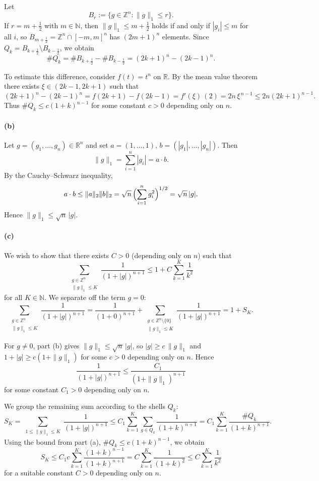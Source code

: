 \documentclass[12pt,a4paper]{article}
\theoremstyle{plain}
\theoremstyle{definition}
\theoremstyle{remark}
\theoremstyle{remark}
\begin{document}
Let
\[
B_r := \{g\in\mathbb{Z}^n : \|g\|_1 \le r\}.
\]
If $r=m+\tfrac12$ with $m\in\mathbb{N}$, then
$\|g\|_1\le m+\tfrac12$ holds if and only if $|g_i|\le m$ for all $i$,
so $B_{m+\frac12}=\mathbb{Z}^n\cap[-m,m]^n$ has $(2m+1)^n$ elements.
Since $Q_k = B_{k+\frac12}\setminus B_{k-\frac12}$, we obtain
\[
\#Q_k = \#B_{k+\frac12} - \#B_{k-\frac12}
= (2k+1)^n - (2k-1)^n.
\]

To estimate this difference, consider $f(t)=t^n$ on $\mathbb{R}$.  By the
mean value theorem there exists $\xi\in(2k-1,2k+1)$ such that
\[
(2k+1)^n - (2k-1)^n
= f(2k+1)-f(2k-1)
= f'(\xi)\,(2)
= 2n\,\xi^{\,n-1}
\le 2n(2k+1)^{n-1}.
\]
Thus $\#Q_k\le c(1+k)^{n-1}$ for some constant $c>0$ depending only on
$n$.

\paragraph{(b)}
Let $g=(g_1,\dots,g_n)\in\mathbb{R}^n$ and set
$a=(1,\dots,1)$, $b=(|g_1|,\dots,|g_n|)$.  Then
\[
\|g\|_1 = \sum_{i=1}^n |g_i| = a\cdot b.
\]
By the Cauchy--Schwarz inequality,
\[
a\cdot b \le \|a\|_2 \|b\|_2
= \sqrt{n}\,\Bigl(\sum_{i=1}^n g_i^2\Bigr)^{1/2}
= \sqrt{n}\,|g|.
\]
Hence $\|g\|_1 \le \sqrt{n}\,|g|$.

\paragraph{(c)}
We wish to show that there exists $C>0$ (depending only on $n$) such
that
\[
\sum_{\substack{g\in\mathbb{Z}^n\\ \|g\|_1\le K}}
\frac{1}{(1+|g|)^{n+1}}
\le 1 + C\sum_{k=1}^K \frac{1}{k^2}
\]
for all $K\in\mathbb{N}$.  We separate off the term $g=0$:
\[
\sum_{\substack{g\in\mathbb{Z}^n\\ \|g\|_1\le K}}
\frac{1}{(1+|g|)^{n+1}}
= \frac{1}{(1+0)^{n+1}}
+ \sum_{\substack{g\in\mathbb{Z}^n\setminus\{0\}\\ \|g\|_1\le K}}
\frac{1}{(1+|g|)^{n+1}}
= 1 + S_K.
\]

For $g\neq 0$, part (b) gives $\|g\|_1 \le \sqrt{n}\,|g|$, so
$|g| \ge c\,\|g\|_1$ and $1+|g| \ge c(1+\|g\|_1)$ for some $c>0$
depending only on $n$.  Hence
\[
\frac{1}{(1+|g|)^{n+1}}
\le \frac{C_1}{(1+\|g\|_1)^{n+1}}
\]
for some constant $C_1>0$ depending only on $n$.

We group the remaining sum according to the shells $Q_k$:
\[
S_K
= \sum_{\substack{1\le\|g\|_1\le K}}
\frac{1}{(1+|g|)^{n+1}}
\le C_1 \sum_{k=1}^K \sum_{g\in Q_k}
\frac{1}{(1+k)^{n+1}}
= C_1 \sum_{k=1}^K \frac{\#Q_k}{(1+k)^{n+1}}.
\]
Using the bound from part (a), $\#Q_k\le c(1+k)^{n-1}$, we obtain
\[
S_K
\le C_1 c \sum_{k=1}^K \frac{(1+k)^{n-1}}{(1+k)^{n+1}}
= C \sum_{k=1}^K \frac{1}{(1+k)^2}
\le C \sum_{k=1}^K \frac{1}{k^2}
\]
for a suitable constant $C>0$ depending only on $n$.
\end{document}
